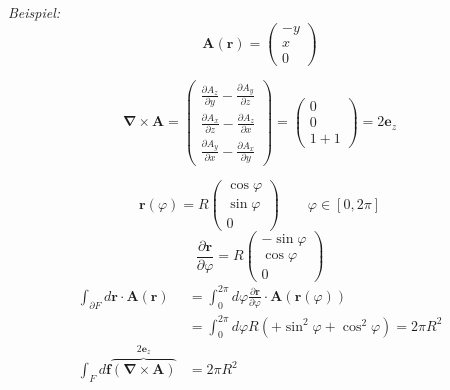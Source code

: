 \documentclass[titlepage,11pt,a4paper,ngerman]{report}
\newcommand{\ob}[1]{\overbrace{#1}}
\renewcommand{\vec}[1]{\boldsymbol{#1}}
\begin{document}
\emph{Beispiel:}
\begin{equation*}
\vec{A}(\vec{r}) = \begin{pmatrix}
-y \\ x \\ 0
\end{pmatrix}
\end{equation*}


\begin{equation*}
\vec{\nabla} \times \vec{A} = \begin{pmatrix}
\frac{\partial A_z}{\partial y} - \frac{\partial A_y}{\partial z} \\
\frac{\partial A_x}{\partial z} - \frac{\partial A_z}{\partial x} \\
\frac{\partial A_y}{\partial x} - \frac{\partial A_x}{\partial y}
\end{pmatrix} = \begin{pmatrix}
0 \\ 0 \\ 1 + 1
\end{pmatrix} = 2 \vec{e}_z
\end{equation*}


\begin{equation*}
\vec{r}(\varphi) = R \begin{pmatrix}
\cos \varphi \\ \sin \varphi \\ 0
\end{pmatrix} \qquad \varphi \in [0,2\pi]
\end{equation*}
\begin{equation*}
\frac{\partial \vec{r}}{\partial \varphi} = R \begin{pmatrix}
- \sin \varphi \\ \cos \varphi \\ 0
\end{pmatrix}
\end{equation*}
\begin{align*}
\int_{\partial F} d \vec{r} \cdot \vec{A}(\vec{r}) &= \int_{0}^{2 \pi} d \varphi \frac{\partial \vec{r}}{\partial \varphi} \cdot \vec{A}( \vec{r} ( \varphi)) \\
&= \int_{0}^{2 \pi} d \varphi R ( + \sin^2 \varphi + \cos^2 \varphi) = 2 \pi R^2\\
\int_F d\vec{f} \ob{\left(\vec{\nabla} \times  \vec{A}\right)}^{2 \vec{e}_z} &= 2 \pi R^2
\end{align*}
\end{document}
